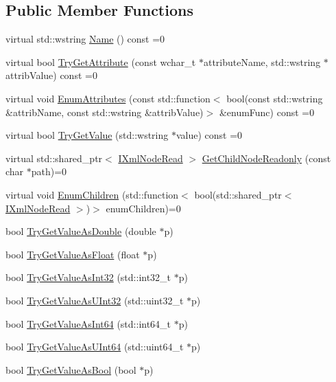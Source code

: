 \subsection*{Public Member Functions}
\begin{DoxyCompactItemize}
\item 
virtual std\+::wstring \hyperlink{classlib_c_z_i_1_1_i_xml_node_read_a7a17744c795303a9c446b5ccf850a90c}{Name} () const =0
\item 
virtual bool \hyperlink{classlib_c_z_i_1_1_i_xml_node_read_a7cf31fe7e079358d5436289ee678e0df}{Try\+Get\+Attribute} (const wchar\+\_\+t $\ast$attribute\+Name, std\+::wstring $\ast$attrib\+Value) const =0
\item 
virtual void \hyperlink{classlib_c_z_i_1_1_i_xml_node_read_afe7294913f033998c7a0bb695d795c0f}{Enum\+Attributes} (const std\+::function$<$ bool(const std\+::wstring \&attrib\+Name, const std\+::wstring \&attrib\+Value)$>$ \&enum\+Func) const =0
\item 
virtual bool \hyperlink{classlib_c_z_i_1_1_i_xml_node_read_ab09530bf1a4633c499660da018bc0d89}{Try\+Get\+Value} (std\+::wstring $\ast$value) const =0
\item 
virtual std\+::shared\+\_\+ptr$<$ \hyperlink{classlib_c_z_i_1_1_i_xml_node_read}{I\+Xml\+Node\+Read} $>$ \hyperlink{classlib_c_z_i_1_1_i_xml_node_read_a4e14de646b5624daf11b16ba42094c74}{Get\+Child\+Node\+Readonly} (const char $\ast$path)=0
\item 
virtual void \hyperlink{classlib_c_z_i_1_1_i_xml_node_read_a70385059cfda44a6f2d590a9a8d6ac3e}{Enum\+Children} (std\+::function$<$ bool(std\+::shared\+\_\+ptr$<$ \hyperlink{classlib_c_z_i_1_1_i_xml_node_read}{I\+Xml\+Node\+Read} $>$)$>$ enum\+Children)=0
\item 
bool \hyperlink{classlib_c_z_i_1_1_i_xml_node_read_a3bb9226ebe823d70968e694407f90bc7}{Try\+Get\+Value\+As\+Double} (double $\ast$p)
\item 
bool \hyperlink{classlib_c_z_i_1_1_i_xml_node_read_af3070ab11416f7658e198d8cd89210c0}{Try\+Get\+Value\+As\+Float} (float $\ast$p)
\item 
bool \hyperlink{classlib_c_z_i_1_1_i_xml_node_read_ad03686b294d2271dfa1a44c88c0751bc}{Try\+Get\+Value\+As\+Int32} (std\+::int32\+\_\+t $\ast$p)
\item 
bool \hyperlink{classlib_c_z_i_1_1_i_xml_node_read_a0cbe508500066393c05e5ebdfc3c7df7}{Try\+Get\+Value\+As\+U\+Int32} (std\+::uint32\+\_\+t $\ast$p)
\item 
bool \hyperlink{classlib_c_z_i_1_1_i_xml_node_read_adbf74c7628e88a54791b315c12b176bf}{Try\+Get\+Value\+As\+Int64} (std\+::int64\+\_\+t $\ast$p)
\item 
bool \hyperlink{classlib_c_z_i_1_1_i_xml_node_read_a6a250a2916f16985eff64b7a82ed2d99}{Try\+Get\+Value\+As\+U\+Int64} (std\+::uint64\+\_\+t $\ast$p)
\item 
bool \hyperlink{classlib_c_z_i_1_1_i_xml_node_read_a2d12c91c7ff8ef3b822d623f6c04b14f}{Try\+Get\+Value\+As\+Bool} (bool $\ast$p)
\end{DoxyCompactItemize}


